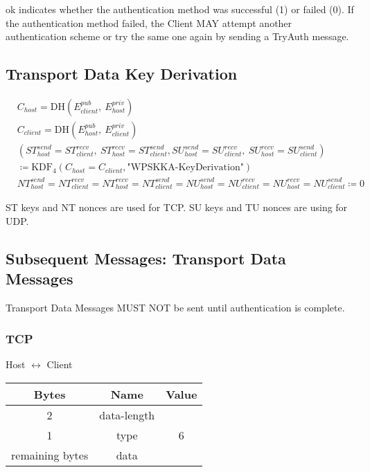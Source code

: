ok indicates whether the authentication method was successful (1) or failed (0).
If the authentication method failed, the Client MAY attempt another authentication scheme or try the same one again by sending a TryAuth message.

\subsection{Transport Data Key Derivation}

\begin{align*}
    & C_{host} = \text{DH}(E_{client}^{pub},\ E_{host}^{priv})\\
    & C_{client} = \text{DH}(E_{host}^{pub},\ E_{client}^{priv})\\
    & (\mathit{ST}_{host}^{send} = \mathit{ST}_{client}^{recv},\ \mathit{ST}_{host}^{recv} =
    \mathit{ST}_{client}^{send}, \mathit{SU}_{host}^{send} = \mathit{SU}_{client}^{recv},\ \mathit{SU}_{host}^{recv}
    = \mathit{SU}_{client}^{send}) \\
    & \coloneqq \text{KDF}_4(C_{host} = C_{client},\text{"WPSKKA-KeyDerivation"}) \\
    & \mathit{NT}_{host}^{send} = \mathit{NT}_{client}^{recv} = \mathit{NT}_{host}^{recv} = \mathit{NT}_{client}^{send} = \mathit{NU}_{host}^{send} = \mathit{NU}_{client}^{recv} = \mathit{NU}_{host}^{recv} = \mathit{NU}_{client}^{send} \coloneqq 0
\end{align*}

ST keys and NT nonces are used for TCP. SU keys and TU nonces are using for UDP.

\subsection{Subsequent Messages: Transport Data Messages}

Transport Data Messages MUST NOT be sent until authentication is complete.

\subsubsection{TCP}

\begin{center}
    Host $\leftrightarrow$ Client\\
    \begin{tabular}{|c|c|c|}
        \hline
        \textbf{Bytes}  & \textbf{Name} & \textbf{Value} \\
        \hline
        2               & data-length   &                \\
        \hline
        1               & type          & 6              \\
        \hline
        remaining bytes & data          &                \\
        \hline
    \end{tabular}
\end{center}

